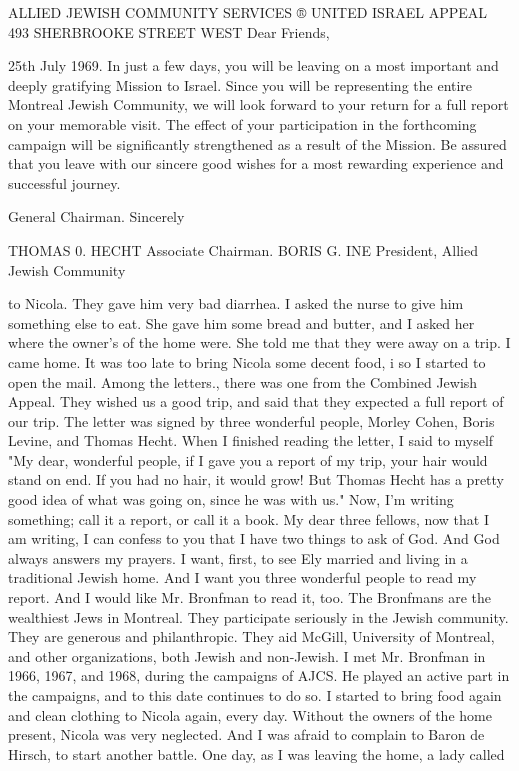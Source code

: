 
ALLIED JEWISH COMMUNITY SERVICES ® UNITED ISRAEL APPEAL 
493 SHERBROOKE STREET WEST 
Dear Friends, 

25th July 1969. 
In just a few days, you will be leaving 
on a most important and deeply gratifying Mission to 
Israel. Since you will be representing the entire 
Montreal Jewish Community, we will look forward to 
your return for a full report on your memorable visit. 
The effect of your participation in the 
forthcoming campaign will be significantly strengthened 
as a result of the Mission. Be assured that you leave 
with our sincere good wishes for a most rewarding 
experience and successful journey. 

General Chairman. 
Sincerely

THOMAS 0. HECHT 
Associate Chairman. 
BORIS G. INE 
President, 
Allied Jewish Community 

to Nicola. They gave him very bad diarrhea. I asked the nurse to 
give him something else to eat. She gave him some bread and butter, 
and I asked her where the owner's of the home were. She told me that 
they were away on a trip. 
I came home. It was too late to bring Nicola some decent food, i 
so I started to open the mail. Among the letters., there was one 
from the Combined Jewish Appeal. They wished us a good trip, and 
said that they expected a full report of our trip. The letter was 
signed by three wonderful people, Morley Cohen, Boris Levine, and 
Thomas Hecht. When I finished reading the letter, I said to myself 
"My dear, wonderful people, if I gave you a report of my trip, your 
hair would stand on end. If you had no hair, it would grow! But 
Thomas Hecht has a pretty good idea of what was going on, since he 
was with us." 
Now, I'm writing something; call it a report, or call it a book. 
My dear three fellows, now that I am writing, I can confess to you 
that I have two things to ask of God. And God always answers my 
prayers. I want, first, to see Ely married and living in a traditional Jewish home. And I want you three wonderful people to read my 
report. And I would like Mr. Bronfman to read it, too. 
The Bronfmans are the wealthiest Jews in Montreal. They participate seriously in the Jewish community. They are generous and philanthropic. They aid McGill, University of Montreal, and other organizations, both Jewish and non-Jewish. I met Mr. Bronfman in 1966, 
1967, and 1968, during the campaigns of AJCS. He played an active 
part in the campaigns, and to this date continues to do so. 
I started to bring food again and clean clothing to Nicola again, 
every day. Without the owners of the home present, Nicola was very 
neglected. And I was afraid to complain to Baron de Hirsch, to start 
another battle. One day, as I was leaving the home, a lady called 

